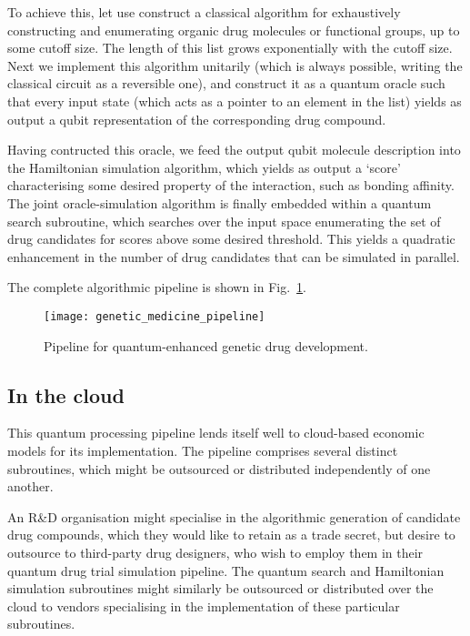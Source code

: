 To achieve this, let use construct a classical algorithm for exhaustively constructing and enumerating organic drug molecules or functional groups, up to some cutoff size. The length of this list grows exponentially with the cutoff size. Next we implement this algorithm unitarily (which is always possible, writing the classical circuit as a reversible one), and construct it as a quantum oracle such that every input state (which acts as a pointer to an element in the list) yields as output a qubit representation of the corresponding drug compound.

Having contructed this oracle, we feed the output qubit molecule description into the Hamiltonian simulation algorithm, which yields as output a `score' characterising some desired property of the interaction, such as bonding affinity. The joint oracle-simulation algorithm is finally embedded within a quantum search subroutine, which searches over the input space enumerating the set of drug candidates for scores above some desired threshold. This yields a quadratic enhancement in the number of drug candidates that can be simulated in parallel.

The complete algorithmic pipeline is shown in Fig.~\ref{fig:genetic_med_pipe}.

\begin{figure}[!htb]
	\texttt{[image: genetic\_medicine\_pipeline]}
	\caption{Pipeline for quantum-enhanced genetic drug development.} \label{fig:genetic_med_pipe}
\end{figure}

%
%

\subsection{In the cloud}

This quantum processing pipeline lends itself well to cloud-based economic models for its implementation. The pipeline comprises several distinct subroutines, which might be outsourced or distributed independently of one another.

An R\&D organisation might specialise in the algorithmic generation of candidate drug compounds, which they would like to retain as a trade secret, but desire to outsource to third-party drug designers, who wish to employ them in their quantum drug trial simulation pipeline. The quantum search and Hamiltonian simulation subroutines might similarly be outsourced or distributed over the cloud to vendors specialising in the implementation of these particular subroutines.

